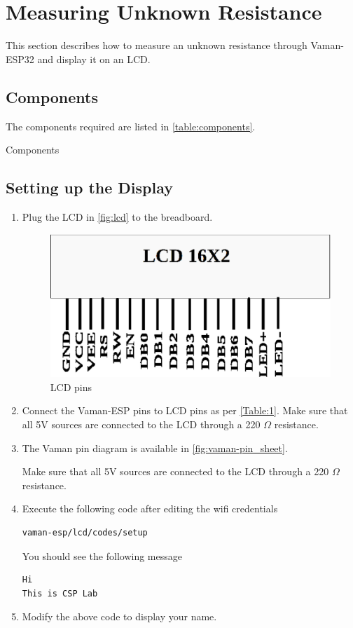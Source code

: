 \section{Measuring Unknown Resistance}
This section describes how to measure an unknown resistance through Vaman-ESP32
and display it on an LCD.
\subsection{Components}
The components required are listed in \autoref{table:components}.
\begin{table}[!ht]
\centering

\caption{Components}
\label{table:components}
\end{table}

\subsection{Setting up the Display}
\begin{enumerate}
\item
Plug the LCD in \autoref{fig:lcd} to the breadboard.

\begin{figure}
\centering
\includegraphics[width=\columnwidth]{vaman-esp32/lcd/figs/lcd.eps}
\caption{LCD pins}
\label{fig:lcd}
\end{figure}
\item
Connect the Vaman-ESP pins to LCD pins as per \autoref{Table:1}. Make sure that
all 5V sources are connected to the LCD through a 220 $\Omega$ resistance.
\item
The Vaman pin diagram is available in \autoref{fig:vaman-pin_sheet}.
\begin{table}[!ht]
\centering

\caption{Make sure that all 5V sources are connected to the LCD through a 220 $\Omega$ resistance.}
\label{Table:1}
\end{table}

\item Execute the following code after editing the wifi credentials
\begin{lstlisting}
vaman-esp/lcd/codes/setup
\end{lstlisting}
You should see the following message
\begin{lstlisting}
Hi
This is CSP Lab
\end{lstlisting}
\item Modify the above code to display your name.
\end{enumerate}
